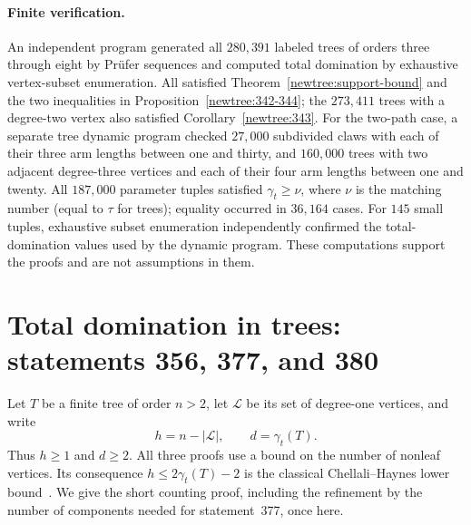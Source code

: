 \documentclass[11pt,a4paper]{article}
\theoremstyle{remark}
\begin{document}
\paragraph{Finite verification.}
An independent program generated all $280{,}391$ labeled trees of orders
three through eight by Pr\"ufer sequences and computed total domination
by exhaustive vertex-subset enumeration.  All satisfied
Theorem~\ref{newtree:support-bound} and the two inequalities in
Proposition~\ref{newtree:342-344}; the $273{,}411$ trees with a degree-two
vertex also satisfied Corollary~\ref{newtree:343}.  For the two-path case,
a separate tree dynamic program checked $27{,}000$ subdivided claws with
each of their three arm lengths between one and thirty, and $160{,}000$
trees with two adjacent degree-three vertices and each of their four arm
lengths between one and twenty.  All $187{,}000$ parameter tuples
satisfied $\gamma_t\geq\nu$, where $\nu$ is the matching number
(equal to $\tau$ for trees); equality occurred in $36{,}164$ cases.
For $145$ small tuples, exhaustive subset enumeration independently
confirmed the total-domination values used by the dynamic program.
These computations support the proofs and are not assumptions in them.

\section{Total domination in trees: statements 356, 377, and 380}
\label{r3tree:section}

Let $T$ be a finite tree of order $n>2$, let $\mathcal L$ be its set
of degree-one vertices, and write
\[
h=n-|\mathcal L|,\qquad d=\gamma_t(T).
\]
Thus $h\ge1$ and $d\ge2$.  All three proofs use a bound on the
number of nonleaf vertices.  Its consequence $h\le2\gamma_t(T)-2$
is the classical Chellali--Haynes lower bound~\cite{CH06}.  We give
the short counting proof, including the refinement by the number
of components needed for statement~377, once here.
\end{document}

